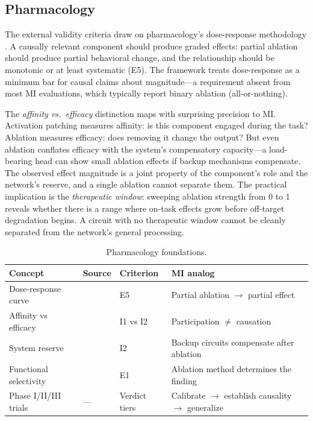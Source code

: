 \documentclass[10pt]{article}
\begin{document}
\subsection{Pharmacology}
\label{sec:pharma}

The external validity criteria draw on pharmacology's dose-response methodology \citep{rang2006drug}. A causally relevant component should produce graded effects: partial ablation should produce partial behavioral change, and the relationship should be monotonic or at least systematic (E5). The framework treats dose-response as a minimum bar for causal claims about magnitude---a requirement absent from most MI evaluations, which typically report binary ablation (all-or-nothing).

The \emph{affinity vs.\ efficacy} distinction maps with surprising precision to MI. Activation patching measures affinity: is this component engaged during the task? Ablation measures efficacy: does removing it change the output? But even ablation conflates efficacy with the system's compensatory capacity---a load-bearing head can show small ablation effects if backup mechanisms compensate. The observed effect magnitude is a joint property of the component's role and the network's reserve, and a single ablation cannot separate them. The practical implication is the \emph{therapeutic window}: sweeping ablation strength from 0 to 1 reveals whether there is a range where on-task effects grow before off-target degradation begins. A circuit with no therapeutic window cannot be cleanly separated from the network's general processing.

\begin{table}[H]
\centering\small
\caption{Pharmacology foundations.}
\renewcommand{\arraystretch}{1.12}
\begin{tabular}{@{}l>{\raggedright\arraybackslash}p{2.2cm}l>{\raggedright\arraybackslash}p{4.5cm}@{}}
\toprule
\textbf{Concept} & \textbf{Source} & \textbf{Criterion} & \textbf{MI analog} \\
\midrule
Dose-response curve & \citet{hill1910possible} & E5 & Partial ablation $\to$ partial effect \\
\midrule
Affinity vs efficacy & \citet{stephenson1956modification} & I1 vs I2 & Participation $\neq$ causation \\
\midrule
System reserve & \citet{black1983operational} & I2 & Backup circuits compensate after ablation \\
\midrule
Functional selectivity & \citet{kenakin2004functional} & E1 & Ablation method determines the finding \\
\midrule
Phase I/II/III trials & --- & Verdict tiers & Calibrate $\to$ establish causality $\to$ generalize \\
\bottomrule
\end{tabular}
\end{table}
\end{document}
